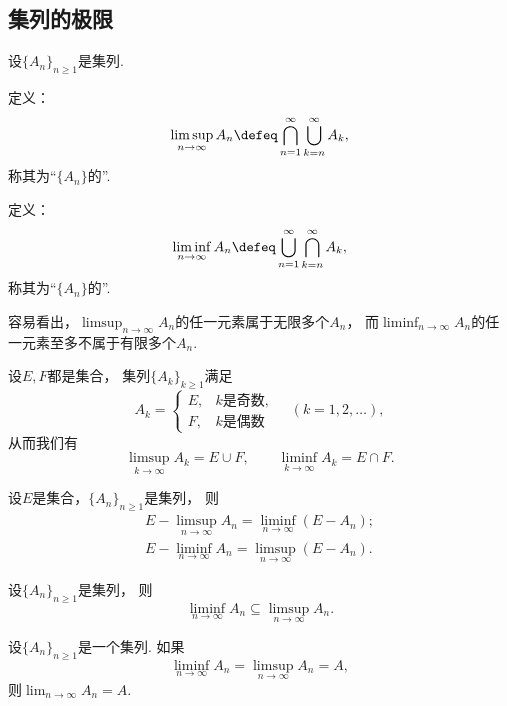 \subsection{集列的极限}
\begin{definition}
设\(\{A_n\}_{n\geq1}\)是集列.

定义：\[
	\limsup_{n\to\infty} A_n
	\defeq
	\bigcap_{n=1}^\infty
	\bigcup_{k=n}^\infty
	A_k,
\]
称其为“\(\{A_n\}\)的”.

定义：\[
	\liminf_{n\to\infty} A_n
	\defeq
	\bigcup_{n=1}^\infty
	\bigcap_{k=n}^\infty
	A_k,
\]
称其为“\(\{A_n\}\)的”.
\end{definition}
容易看出，\(\limsup_{n\to\infty} A_n\)的任一元素属于无限多个\(A_n\)，
而\(\liminf_{n\to\infty} A_n\)的任一元素至多不属于有限多个\(A_n\).

\begin{example}
设\(E,F\)都是集合，
集列\(\{A_k\}_{k\geq1}\)满足\[
	A_k = \left\{ \begin{array}{cl}
		E, & \text{$k$是奇数}, \\
		F, & \text{$k$是偶数}
	\end{array} \right.
	\quad(k=1,2,\dotsc),
\]
从而我们有\[
	\limsup_{k\to\infty} A_k
	= E \cup F, \qquad
	\liminf_{k\to\infty} A_k
	= E \cap F.
\]
\end{example}

\begin{proposition}
设\(E\)是集合，\(\{A_n\}_{n\geq1}\)是集列，
则\begin{gather}
	E - \limsup_{n\to\infty} A_n = \liminf_{n\to\infty} (E - A_n); \\
	E - \liminf_{n\to\infty} A_n = \limsup_{n\to\infty} (E - A_n).
\end{gather}
\end{proposition}

\begin{proposition}
设\(\{A_n\}_{n\geq1}\)是集列，
则\begin{equation}
	\liminf_{n\to\infty} A_n
	\subseteq
	\limsup_{n\to\infty} A_n.
\end{equation}
\end{proposition}

\begin{theorem}
设\(\{A_n\}_{n\geq1}\)是一个集列.
如果\[
	\liminf_{n\to\infty} A_n
	= \limsup_{n\to\infty} A_n
	= A,
\]
则\(\lim_{n\to\infty} A_n = A\).
\end{theorem}

